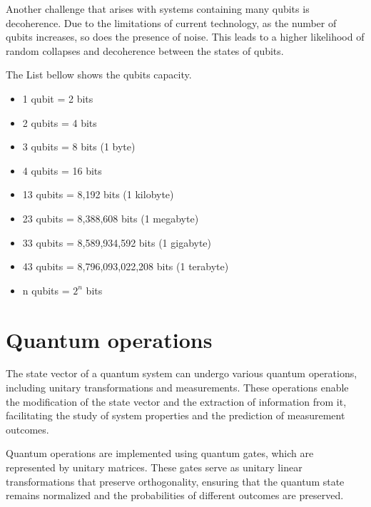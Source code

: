 		\par Another challenge that arises with systems containing many qubits is decoherence. Due to the limitations of current technology, as the number of qubits increases, so does the presence of noise. This leads to a higher likelihood of random collapses and decoherence between the states of qubits.\newline
		
		\par The List bellow shows the qubits capacity.
		
		\begin{itemize}
			\label{lst:qubits}
			\item 1 qubit = 2 bits
			\item 2 qubits = 4 bits
			\item 3 qubits = 8 bits (1 byte)
			\item 4 qubits = 16 bits
			\item 13 qubits = 8,192 bits (1 kilobyte)
			\item 23 qubits = 8,388,608 bits (1 megabyte)
			\item 33 qubits = 8,589,934,592 bits (1 gigabyte)
			\item 43 qubits = 8,796,093,022,208 bits (1 terabyte)
			\item n qubits = $2^n$ bits
		\end{itemize}
	
	
	\section{Quantum operations}
		\label{sec:quantumOperations}
				
		\par The state vector of a quantum system can undergo various quantum operations, including unitary transformations and measurements. These operations enable the modification of the state vector and the extraction of information from it, facilitating the study of system properties and the prediction of measurement outcomes.\newline
		
		\par Quantum operations are implemented using quantum gates, which are represented by unitary matrices. These gates serve as unitary linear transformations that preserve orthogonality, ensuring that the quantum state remains normalized and the probabilities of different outcomes are preserved.\newline
		
